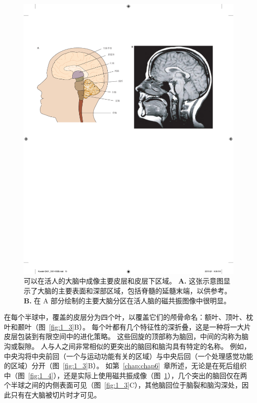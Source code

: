 \begin{figure}[htbp]
	\centering
	\includegraphics[width=1.0\linewidth]{chap01/fig_1_5}
	\caption{可以在活人的大脑中成像主要皮层和皮层下区域。
		\textbf{A.} 这张示意图显示了大脑的主要表面和深部区域，包括脊髓的延髓末端，以供参考。
		\textbf{B.} 在 A 部分绘制的主要大脑分区在活人脑的磁共振图像中很明显。}
	\label{fig:1_5}
\end{figure}


在每个半球中，覆盖的皮层分为四个叶，以覆盖它们的颅骨命名：额叶、顶叶、枕叶和颞叶（图~\ref{fig:1_3}B）。
每个叶都有几个特征性的深折叠，这是一种将一大片皮层包装到有限空间中的进化策略。
这些回旋的顶部称为脑回，中间的沟称为脑沟或裂隙。 
人与人之间非常相似的更突出的脑回和脑沟具有特定的名称。
例如，中央沟将中央前回（一个与运动功能有关的区域）与中央后回（一个处理感觉功能的区域）分开（图~\ref{fig:1_3}B）。
如第~\ref{chap:chap6}~章所述，无论是在死后组织中（图~\ref{fig:1_4}），还是实际上使用磁共振成像（图~\ref{fig:1_5}），几个突出的脑回仅在两个半球之间的内侧表面可见（图~\ref{fig:1_3}C），其他脑回位于脑裂和脑沟深处，因此只有在大脑被切片时才可见。


